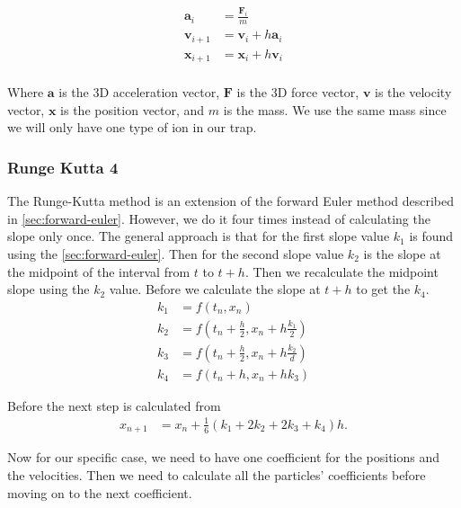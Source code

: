 \begin{align}
  \mathbf{a}_{i} &= \frac{\mathbf{F}_{i}}{m}\\
  \mathbf{v}_{i+1} &= \mathbf{v}_{i} + h\mathbf{a}_{i}\\
  \mathbf{x}_{i+1} &= \mathbf{x}_{i} + h\mathbf{v}_{i}\\
\end{align}


Where $\mathbf{a}$ is the 3D acceleration vector, $\mathbf{F}$ is the 3D force vector,
$\mathbf{v}$ is the velocity vector, $\mathbf{x}$ is the position vector, and $m$ is the mass.
We use the same mass since we will only have one type of ion in our trap.

\subsubsection{Runge Kutta 4}
The Runge-Kutta method is an extension of the forward Euler method described in \ref{sec:forward-euler}.
However, we do it four times instead of calculating the slope only once.
The general approach is that for the first slope value $k_{1}$ is found using the \ref{sec:forward-euler}.
Then for the second slope value $k_{2}$ is the slope at the midpoint of the interval from $t$ to $t + h$.
Then we recalculate the midpoint slope using the $k_{2}$ value.
Before we calculate the slope at $t + h$ to get the $k_{4}$.
\begin{align}
  k_{1} &= f\left(t_{n}, x_{n}\right)\\
  k_{2} &= f\left(t_{n} + \frac{h}{2}, x_{n} + h \frac{k_{1}}{2}\right)\\
  k_{3} &= f\left(t_{n} + \frac{h}{2}, x_{n} + h \frac{k_{2}}{d}\right)\\
  k_{4} &= f\left(t_{n} + h, x_{n} + hk_{3}\right)
\end{align}

Before the next step is calculated from
\begin{align}
  x_{n+1} &= x_{n} + \frac{1}{6}\left(k_{1} + 2k_{2} + 2k_{3} + k_{4}\right)h.
\end{align}

Now for our specific case, we need to have one coefficient for the positions and the velocities.
Then we need to calculate all the particles' coefficients before moving on to the next coefficient.


